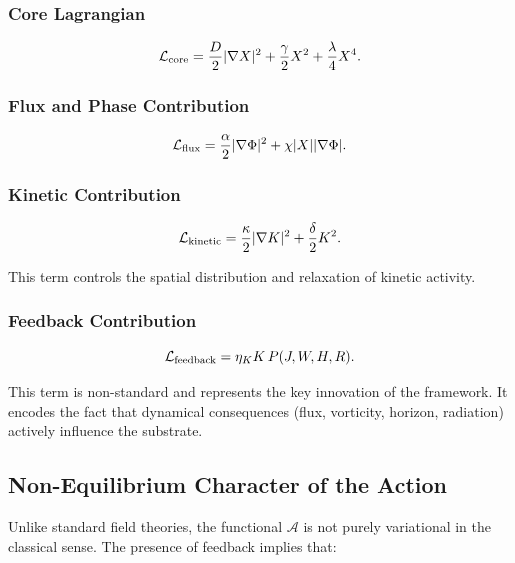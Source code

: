 \documentclass[11pt]{article}
\begin{document}
\subsubsection{Core Lagrangian}

\begin{equation}
\mathcal{L}_{\rm core}
=
\frac{D}{2} |\nabla X|^2
+
\frac{\gamma}{2} X^2
+
\frac{\lambda}{4} X^4.
\end{equation}

\subsubsection{Flux and Phase Contribution}

\begin{equation}
\mathcal{L}_{\rm flux}
=
\frac{\alpha}{2} |\nabla \Phi|^2
+
\chi |X||\nabla \Phi|.
\end{equation}

\subsubsection{Kinetic Contribution}

\begin{equation}
\mathcal{L}_{\rm kinetic}
=
\frac{\kappa}{2} |\nabla K|^2
+
\frac{\delta}{2} K^2.
\end{equation}

This term controls the spatial distribution and relaxation of kinetic activity.

\subsubsection{Feedback Contribution}

\begin{equation}
\mathcal{L}_{\rm feedback}
=
\eta_K K \, P(J,W,H,R).
\end{equation}

This term is non-standard and represents the key innovation of the framework. It encodes the fact that dynamical consequences (flux, vorticity, horizon, radiation) actively influence the substrate.

\subsection{Non-Equilibrium Character of the Action}

Unlike standard field theories, the functional $\mathcal{A}$ is not purely variational in the classical sense. The presence of feedback implies that:
\end{document}
